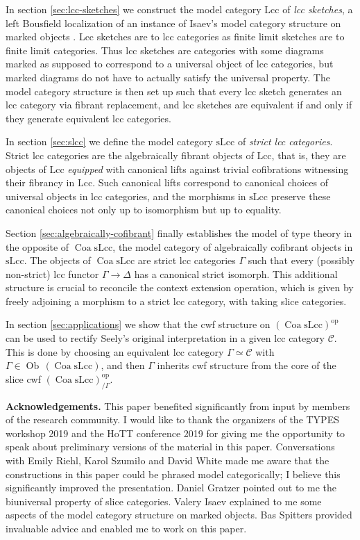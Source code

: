 \documentclass[a4paper]{article}
\theoremstyle{remark}
\theoremstyle{definition}
\begin{document}
In section \ref{sec:lcc-sketches} we construct the model category $\mathrm{Lcc}$ of \emph{lcc sketches}, a left Bousfield localization of an instance of Isaev's model category structure on marked objects \cite{marked-objects}.
Lcc sketches are to lcc categories as finite limit sketches are to finite limit categories.
Thus lcc sketches are categories with some diagrams marked as supposed to correspond to a universal object of lcc categories, but marked diagrams do not have to actually satisfy the universal property.
The model category structure is then set up such that every lcc sketch generates an lcc category via fibrant replacement, and lcc sketches are equivalent if and only if they generate equivalent lcc categories.

In section \ref{sec:slcc} we define the model category $\mathrm{sLcc}$ of \emph{strict lcc categories}.
Strict lcc categories are the algebraically fibrant objects of $\mathrm{Lcc}$, that is, they are objects of $\mathrm{Lcc}$ \emph{equipped} with canonical lifts against trivial cofibrations witnessing their fibrancy in $\mathrm{Lcc}$.
Such canonical lifts correspond to canonical choices of universal objects in lcc categories, and the morphisms in $\mathrm{sLcc}$ preserve these canonical choices not only up to isomorphism but up to equality.

Section \ref{sec:algebraically-cofibrant} finally establishes the model of type theory in the opposite of $\operatorname{Coa} \mathrm{sLcc}$, the model category of algebraically cofibrant objects in $\mathrm{sLcc}$.
The objects of $\operatorname{Coa} \mathrm{sLcc}$ are strict lcc categories $\Gamma$ such that every (possibly non-strict) lcc functor $\Gamma \rightarrow \Delta$ has a canonical strict isomorph.
This additional structure is crucial to reconcile the context extension operation, which is given by freely adjoining a morphism to a strict lcc category, with taking slice categories.

In section \ref{sec:applications} we show that the cwf structure on $(\operatorname{Coa} \mathrm{sLcc})^\mathrm{op}$ can be used to rectify Seely's original interpretation in a given lcc category $\mathcal{C}$.
This is done by choosing an equivalent lcc category $\Gamma \simeq \mathcal{C}$ with $\Gamma \in \operatorname{Ob} \, (\operatorname{Coa} \mathrm{sLcc})$, and then $\Gamma$ inherits cwf structure from the core of the slice cwf $(\operatorname{Coa} \mathrm{sLcc})^\mathrm{op}_{ / \Gamma}$.

\textbf{Acknowledgements.}
This paper benefited significantly from input by members of the research community.
I would like to thank the organizers of the TYPES workshop 2019 and the HoTT conference 2019 for giving me the opportunity to speak about preliminary versions of the material in this paper.
Conversations with Emily Riehl, Karol Szumiło and David White made me aware that the constructions in this paper could be phrased model categorically; I believe this significantly improved the presentation.
Daniel Gratzer pointed out to me the biuniversal property of slice categories.
Valery Isaev explained to me some aspects of the model category structure on marked objects.
Bas Spitters provided invaluable advice and enabled me to work on this paper.
\end{document}
